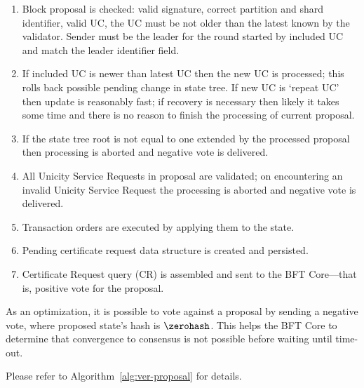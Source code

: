 \begin{enumerate}
  \item Block proposal is checked: valid signature, correct partition and shard identifier, valid UC, the UC must be not older than the latest known by the validator. Sender must be the leader for the round started by included UC and match the leader identifier field.
  \item If included UC is newer than latest UC then the new UC is processed; this rolls back possible pending change in state tree. If new UC is `repeat UC' then update is reasonably fast; if recovery is necessary then likely it takes some time and there is no reason to finish the processing of current proposal.
  \item If the state tree root is not equal to one extended by the processed proposal then processing is aborted and negative vote is delivered.
  \item All Unicity Service Requests in proposal are validated; on encountering an invalid Unicity Service Request the processing is aborted and negative vote is delivered.
  \item Transaction orders are executed by applying them to the state.
  \item Pending certificate request data structure is created and persisted.
  \item Certificate Request query (CR) is assembled and sent to the BFT Core---that is, positive vote for the proposal.
\end{enumerate}

As an optimization, it is possible to vote against a proposal by sending a negative vote, where proposed state's hash is $\zerohash$. This helps the BFT Core to determine that convergence to consensus is not possible before waiting until time-out.

Please refer to Algorithm~\ref{alg:ver-proposal} for details.

